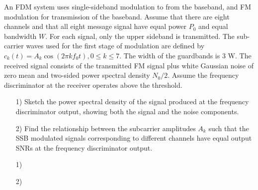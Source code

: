 \documentclass{assignment}
\begin{document}
\begin{prob}
    An FDM system uses single-sideband modulation to from the baseband, and FM modulation for transmission of the baseband. Assume that there are eight channels and that all eight message signal have equal power $P_0$ and equal bandwidth $W$. For each signal, only the upper sideband is transmitted. The sub-carrier waves used for the first stage of modulation are defined by $c_k(t)=A_k\cos(2\pi kf_0t),0\leq k\leq 7$. The width of the guardbands is $3$ W. The received signal consists of the transmitted FM signal plus white Gaussian noise of zero mean and two-sided power spectral density $N_0/2$. Assume the frequency discriminator at the receiver operates above the threshold.
    \begin{itemize}
        \item[1)] Sketch the power spectral density of the signal produced at the frequency discriminator output, showing both the signal and the noise components.
        \item[2)] Find the relationship between the subcarrier amplitudes $A_k$ such that the SSB modulated signals corresponding to different channels have equal output SNRs at the frequency discriminator output.
    \end{itemize}
\end{prob}
\begin{sol}
    \begin{itemize}
        \item[1)] 
        \item[2)] 
    \end{itemize}
\end{sol}
\end{document}
